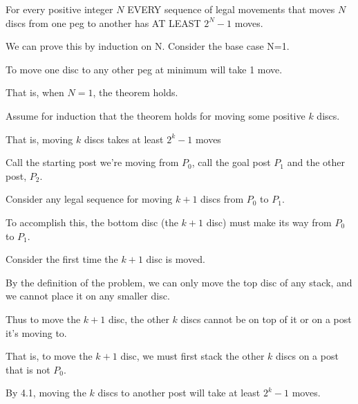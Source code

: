 \documentclass[11pt]{article}
\begin{document}
\begin{problems}


  \newpage

  \problem

  \begin{theorem}
      For every positive integer $N$ EVERY sequence of legal movements that moves $N$ discs from one peg to another has AT LEAST $2^N - 1$ moves.
  \end{theorem}

  \smallskip

  \begin{longFormProof}

    \step We can prove this by induction on N.  Consider the base case N=1.

    \step[S1] To move one disc to any other peg at minimum will take 1 move.
      
    \step That is, when $N = 1$, the theorem holds.

    \begin{block}[A]
      {Assume for induction that the theorem holds for moving some positive $k$ discs.}

      \step That is, moving $k$ discs takes at least $2^k - 1$ moves

      \step Call the starting post we're moving from $P_0$, call the goal post $P_1$ and the other post, $P_2$.

      \begin{block}[B]
        {Consider any legal sequence for moving $k+1$ discs from $P_0$ to $P_1$.}

        \step To accomplish this, the bottom disc (the $k+1$ disc) must make its way from $P_0$ to $P_1$.

        \step Consider the first time the $k+1$ disc is moved.

        \step By the definition of the problem, we can only move the top disc of any stack, and we cannot place it on any smaller disc.

        \step Thus to move the $k+1$ disc, the other $k$ discs cannot be on top of it or on a post it's moving to.

        \step That is, to move the $k+1$ disc, we must first stack the other $k$ discs on a post that is not $P_0$.

        \step By 4.1, moving the $k$ discs to another post will take at least $2^k-1$ moves.


\end{block}
\end{block}
\end{longFormProof}
\end{problems}
\end{document}
